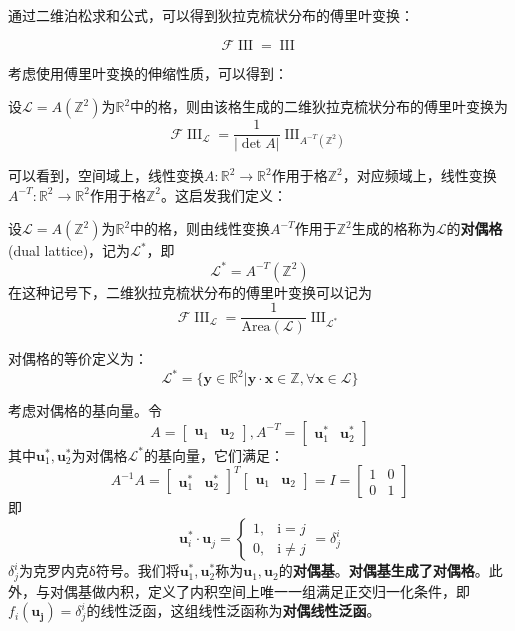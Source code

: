 \documentclass{ctexbook}
\newcommand{\shah}{\operatorname{III}}
\begin{document}
通过二维泊松求和公式，可以得到狄拉克梳状分布的傅里叶变换：
\begin{proposition}[二维狄拉克梳状分布的傅里叶变换]
    \[\mathcal{F} \shah=\shah\]
\end{proposition}

考虑使用傅里叶变换的伸缩性质，可以得到：
\begin{proposition}
    设$\mathcal{L} =A(\mathbb{Z}^2)$为$\mathbb{R}^2$中的格，则由该格生成的二维狄拉克梳状分布的傅里叶变换为
    \[\mathcal{F} \shah_{\mathcal{L} }=\frac{1}{|\det A|}\shah_{A^{-T}(\mathbb{Z}^2)}\]
\end{proposition}

可以看到，空间域上，线性变换$A:\mathbb{R}^2\to\mathbb{R}^2$作用于格$\mathbb{Z}^2$，对应频域上，线性变换$A^{-T}:\mathbb{R}^2\to\mathbb{R}^2$作用于格$\mathbb{Z}^2$。这启发我们定义：
\begin{definition}[对偶格]
    设$\mathcal{L} =A(\mathbb{Z}^2)$为$\mathbb{R}^2$中的格，则由线性变换$A^{-T}$作用于$\mathbb{Z}^2$生成的格称为$\mathcal{L} $的\textbf{对偶格}(dual lattice)，记为$\mathcal{L} ^*$，即
    \[\mathcal{L} ^*=A^{-T}(\mathbb{Z}^2)\]
    在这种记号下，二维狄拉克梳状分布的傅里叶变换可以记为
    \[\mathcal{F} \shah_{\mathcal{L} }=\frac{1}{\mathrm{Area}(\mathcal{L} )}\shah_{\mathcal{L} ^*}\]

    对偶格的等价定义为：
    \[\mathcal{L} ^*=\{\mathbf{y}\in\mathbb{R}^2\left|\mathbf{y}\cdot \mathbf{x}\in\mathbb{Z},\forall \mathbf{x}\in\mathcal{L}\right. \}\]
\end{definition}
\begin{definition}[对偶基与对偶线性泛函]
    考虑对偶格的基向量。令
    \[A=\begin{bmatrix}
        \mathbf{u}_1&\mathbf{u}_2
    \end{bmatrix},A^{-T}=\begin{bmatrix}
        \mathbf{u}^*_1&\mathbf{u}^*_2
    \end{bmatrix}\]
    其中$\mathbf{u}^*_1,\mathbf{u}^*_2$为对偶格$\mathcal{L} ^*$的基向量，它们满足：
    \[A^{-1}A=\begin{bmatrix}
        \mathbf{u}^*_1&\mathbf{u}^*_2
    \end{bmatrix}^T\begin{bmatrix}
        \mathbf{u}_1&\mathbf{u}_2
    \end{bmatrix}=I=\begin{bmatrix}
        1&0\\
        0&1
    \end{bmatrix}\]
    即\[\mathbf{u}^*_i\cdot \mathbf{u}_j=\begin{cases}
    1,&\mathrm{i}=j\\
    0,&\mathrm{i}\neq j
    \end{cases}=\delta^i_{j}\]
    $\delta^i_{j}$为克罗内克δ符号。我们将$\mathbf{u}^*_1,\mathbf{u}^*_2$称为$\mathbf{u}_1,\mathbf{u}_2$的\textbf{对偶基}。\textbf{对偶基生成了对偶格}。此外，与对偶基做内积，定义了内积空间上唯一一组满足正交归一化条件，即$f_i(\mathbf{u_j})=\delta^i_{j}$的线性泛函，这组线性泛函称为\textbf{对偶线性泛函}。
\end{definition}
\end{document}
